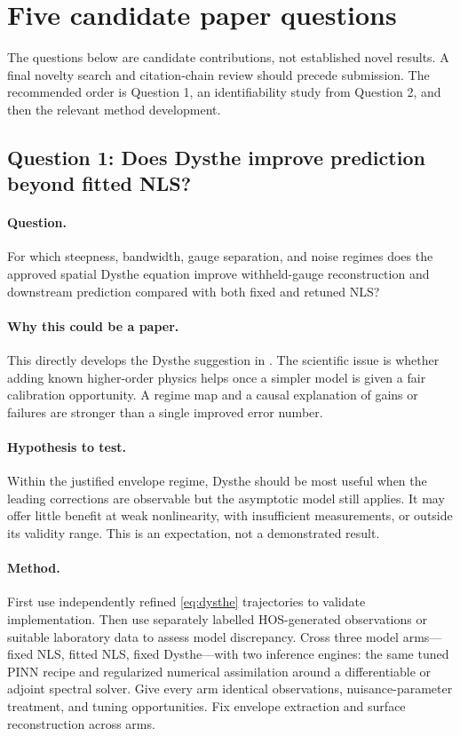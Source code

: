 \section{Five candidate paper questions}
\label{sec:questions}
The questions below are candidate contributions, not established novel
results. A final novelty search and citation-chain review should precede
submission. The recommended order is Question 1, an identifiability study
from Question 2, and then the relevant method development.

\subsection{Question 1: Does Dysthe improve prediction beyond fitted NLS?}
\paragraph{Question.}
For which steepness, bandwidth, gauge separation, and noise regimes does
the approved spatial Dysthe equation improve withheld-gauge reconstruction
and downstream prediction compared with both fixed and retuned NLS?

\paragraph{Why this could be a paper.}
This directly develops the Dysthe suggestion in \cite{ehlers2024}.
The scientific issue is whether adding known higher-order physics helps
once a simpler model is given a fair calibration opportunity. A regime
map and a causal explanation of gains or failures are stronger than a
single improved error number.

\paragraph{Hypothesis to test.}
Within the justified envelope regime, Dysthe should be most useful when
the leading corrections are observable but the asymptotic model still
applies. It may offer little benefit at weak nonlinearity, with insufficient
measurements, or outside its validity range. This is an expectation, not
a demonstrated result.

\paragraph{Method.}
First use independently refined \eqref{eq:dysthe} trajectories to validate
implementation. Then use separately labelled HOS-generated observations
or suitable laboratory data to assess model discrepancy. Cross three model
arms---fixed NLS, fitted NLS, fixed Dysthe---with two inference engines:
the same tuned PINN recipe and regularized numerical assimilation around
a differentiable or adjoint spectral solver. Give every arm identical
observations, nuisance-parameter treatment, and tuning opportunities.
Fix envelope extraction and surface reconstruction across arms.

